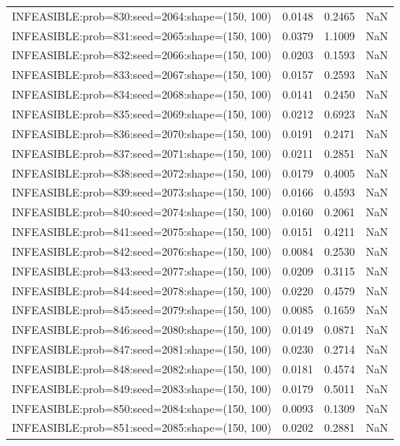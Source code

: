 \begin{longtable}{lccc}
INFEASIBLE:prob=830:seed=2064:shape=(150, 100) &   0.0148 &  0.2465 &    NaN \\
INFEASIBLE:prob=831:seed=2065:shape=(150, 100) &   0.0379 &  1.1009 &    NaN \\
INFEASIBLE:prob=832:seed=2066:shape=(150, 100) &   0.0203 &  0.1593 &    NaN \\
INFEASIBLE:prob=833:seed=2067:shape=(150, 100) &   0.0157 &  0.2593 &    NaN \\
INFEASIBLE:prob=834:seed=2068:shape=(150, 100) &   0.0141 &  0.2450 &    NaN \\
INFEASIBLE:prob=835:seed=2069:shape=(150, 100) &   0.0212 &  0.6923 &    NaN \\
INFEASIBLE:prob=836:seed=2070:shape=(150, 100) &   0.0191 &  0.2471 &    NaN \\
INFEASIBLE:prob=837:seed=2071:shape=(150, 100) &   0.0211 &  0.2851 &    NaN \\
INFEASIBLE:prob=838:seed=2072:shape=(150, 100) &   0.0179 &  0.4005 &    NaN \\
INFEASIBLE:prob=839:seed=2073:shape=(150, 100) &   0.0166 &  0.4593 &    NaN \\
INFEASIBLE:prob=840:seed=2074:shape=(150, 100) &   0.0160 &  0.2061 &    NaN \\
INFEASIBLE:prob=841:seed=2075:shape=(150, 100) &   0.0151 &  0.4211 &    NaN \\
INFEASIBLE:prob=842:seed=2076:shape=(150, 100) &   0.0084 &  0.2530 &    NaN \\
INFEASIBLE:prob=843:seed=2077:shape=(150, 100) &   0.0209 &  0.3115 &    NaN \\
INFEASIBLE:prob=844:seed=2078:shape=(150, 100) &   0.0220 &  0.4579 &    NaN \\
INFEASIBLE:prob=845:seed=2079:shape=(150, 100) &   0.0085 &  0.1659 &    NaN \\
INFEASIBLE:prob=846:seed=2080:shape=(150, 100) &   0.0149 &  0.0871 &    NaN \\
INFEASIBLE:prob=847:seed=2081:shape=(150, 100) &   0.0230 &  0.2714 &    NaN \\
INFEASIBLE:prob=848:seed=2082:shape=(150, 100) &   0.0181 &  0.4574 &    NaN \\
INFEASIBLE:prob=849:seed=2083:shape=(150, 100) &   0.0179 &  0.5011 &    NaN \\
INFEASIBLE:prob=850:seed=2084:shape=(150, 100) &   0.0093 &  0.1309 &    NaN \\
INFEASIBLE:prob=851:seed=2085:shape=(150, 100) &   0.0202 &  0.2881 &    NaN \\

\end{longtable}
